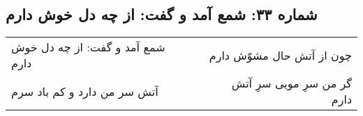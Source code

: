 \begin{center}
\section*{شماره ۳۳: شمع آمد و گفت: از چه دل خوش دارم}
\label{sec:033}
\begin{longtable}{l p{0.5cm} r}
شمع آمد و گفت: از چه دل خوش دارم
&&
چون از آتش حال مشوّش دارم
\\
آتش سر من دارد و کم باد سرم
&&
گر من سرِ مویی سرِ آتش دارم
\\
\end{longtable}
\end{center}
